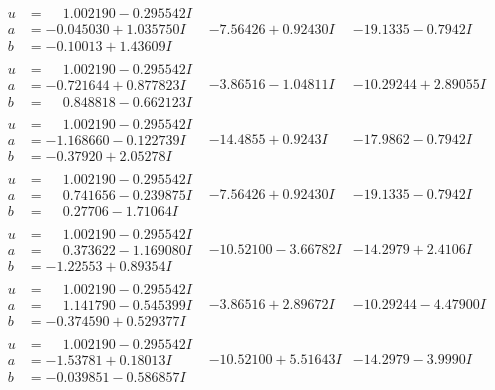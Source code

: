 \documentclass[1p]{elsarticle_modified}
\theoremstyle{definition}
\begin{document}
$$\begin{array}{c|c|c}
\begin{aligned}
u &= \phantom{-}1.002190 - 0.295542 I \\
a &= -0.045030 + 1.035750 I \\
b &= -0.10013 + 1.43609 I\end{aligned}
 & -7.56426 + 0.92430 I & -19.1335 - 0.7942 I \\ \hline\begin{aligned}
u &= \phantom{-}1.002190 - 0.295542 I \\
a &= -0.721644 + 0.877823 I \\
b &= \phantom{-}0.848818 - 0.662123 I\end{aligned}
 & -3.86516 - 1.04811 I & -10.29244 + 2.89055 I \\ \hline\begin{aligned}
u &= \phantom{-}1.002190 - 0.295542 I \\
a &= -1.168660 - 0.122739 I \\
b &= -0.37920 + 2.05278 I\end{aligned}
 & -14.4855 + 0.9243 I & -17.9862 - 0.7942 I \\ \hline\begin{aligned}
u &= \phantom{-}1.002190 - 0.295542 I \\
a &= \phantom{-}0.741656 - 0.239875 I \\
b &= \phantom{-}0.27706 - 1.71064 I\end{aligned}
 & -7.56426 + 0.92430 I & -19.1335 - 0.7942 I \\ \hline\begin{aligned}
u &= \phantom{-}1.002190 - 0.295542 I \\
a &= \phantom{-}0.373622 - 1.169080 I \\
b &= -1.22553 + 0.89354 I\end{aligned}
 & -10.52100 - 3.66782 I & -14.2979 + 2.4106 I \\ \hline\begin{aligned}
u &= \phantom{-}1.002190 - 0.295542 I \\
a &= \phantom{-}1.141790 - 0.545399 I \\
b &= -0.374590 + 0.529377 I\end{aligned}
 & -3.86516 + 2.89672 I & -10.29244 - 4.47900 I \\ \hline\begin{aligned}
u &= \phantom{-}1.002190 - 0.295542 I \\
a &= -1.53781 + 0.18013 I \\
b &= -0.039851 - 0.586857 I\end{aligned}
 & -10.52100 + 5.51643 I & -14.2979 - 3.9990 I \\ \hline\begin{aligned}

\end{aligned}
\end{array}$$
\end{document}
